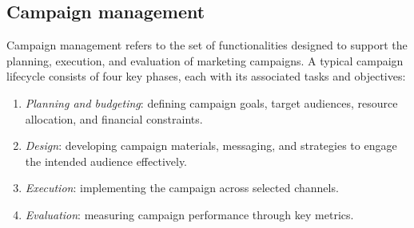 \subsection{Campaign management}
Campaign management refers to the set of functionalities designed to support the planning, execution, and evaluation of marketing campaigns. 
A typical campaign lifecycle consists of four key phases, each with its associated tasks and objectives:
\begin{enumerate}
    \item \textit{Planning and budgeting}: defining campaign goals, target audiences, resource allocation, and financial constraints.
    \item \textit{Design}: developing campaign materials, messaging, and strategies to engage the intended audience effectively.
    \item \textit{Execution}: implementing the campaign across selected channels.
    \item \textit{Evaluation}: measuring campaign performance through key metrics.
\end{enumerate}